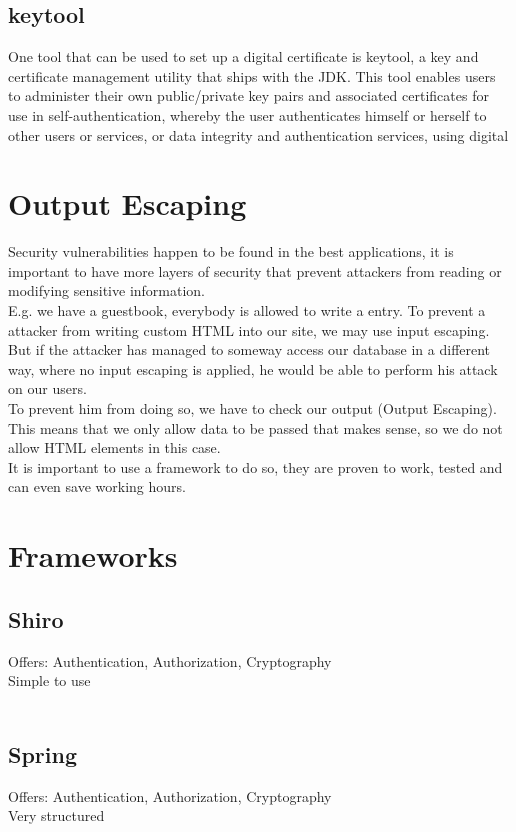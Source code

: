 \documentclass[12pt,a4paper]{report}
\begin{document}
\section{keytool}
One tool that can be used to set up a digital certificate is keytool, a key and certificate management utility that ships with the JDK. This tool enables users to administer their own public/private key pairs and associated certificates for use in self-authentication, whereby the user authenticates himself or herself to other users or services, or data integrity and authentication services, using digital 

\chapter{Output Escaping}
Security vulnerabilities happen to be found in the best applications, it is important to have more layers of security that prevent attackers from reading or modifying sensitive information.\\
E.g. we have a guestbook, everybody is allowed to write a entry. To prevent a attacker from writing custom HTML into our site, we may use input escaping. But if the attacker has managed to someway access our database in a different way, where no input escaping is applied, he would be able to perform his attack on our users.\\
To prevent him from doing so, we have to check our output (Output Escaping). This means that we only allow data to be passed that makes sense, so we do not allow HTML elements in this case.\\
It is important to use a framework to do so, they are proven to work, tested and can even save working hours.

\chapter{Frameworks}
\section{Shiro}
Offers: Authentication, Authorization, Cryptography\\
Simple to use\\\\

\section{Spring}
Offers: Authentication, Authorization, Cryptography\\
Very structured\\\\
\end{document}
